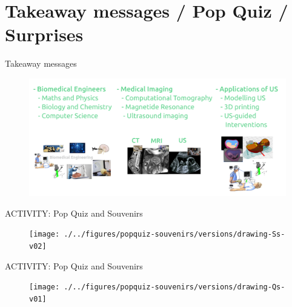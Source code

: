 \section{Takeaway messages / Pop Quiz / Surprises }



{
\begin{frame}{Takeaway messages}
  \begin{figure}
  \centering
  \includegraphics[width=1.0\textwidth]{./../figures/takeaways/versions/drawing-v04}
  \end{figure}

\end{frame}
}

{
\begin{frame}{\faOptinMonster \faUsers ACTIVITY:  Pop Quiz and Souvenirs}
  \begin{figure}
  \centering
  \texttt{[image: ./../figures/popquiz-souvenirs/versions/drawing-Ss-v02]}
  \end{figure}

\end{frame}
}


{
\begin{frame}{\faOptinMonster \faUsers ACTIVITY:  Pop Quiz and Souvenirs}
  \begin{figure}
  \centering
  \texttt{[image: ./../figures/popquiz-souvenirs/versions/drawing-Qs-v01]}
  \end{figure}

\end{frame}
}


